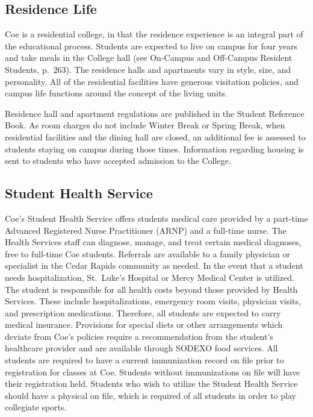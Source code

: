 \documentclass[
  letterpaper,
]{scrbook}
\begin{document}
\hypertarget{residence-life}{%
\subsection{Residence Life}\label{residence-life}}

Coe is a residential college, in that the residence experience is an
integral part of the educational process. Students are expected to live
on campus for four years and take meals in the College hall (see
On-Campus and Off-Campus Resident Students, p.~263). The residence halls
and apartments vary in style, size, and personality. All of the
residential facilities have generous visitation policies, and campus
life functions around the concept of the living units.

Residence hall and apartment regulations are published in the Student
Reference Book. As room charges do not include Winter Break or Spring
Break, when residential facilities and the dining hall are closed, an
additional fee is assessed to students staying on campus during those
times. Information regarding housing is sent to students who have
accepted admission to the College.

\hypertarget{student-health-service}{%
\subsection{Student Health Service}\label{student-health-service}}

Coe's Student Health Service offers students medical care provided by a
part-time Advanced Registered Nurse Practitioner (ARNP) and a full-time
nurse. The Health Services staff can diagnose, manage, and treat certain
medical diagnoses, free to full-time Coe students. Referrals are
available to a family physician or specialist in the Cedar Rapids
community as needed. In the event that a student needs hospitalization,
St.~Luke's Hospital or Mercy Medical Center is utilized. The student is
responsible for all health costs beyond those provided by Health
Services. These include hospitalizations, emergency room visits,
physician visits, and prescription medications. Therefore, all students
are expected to carry medical insurance. Provisions for special diets or
other arrangements which deviate from Coe's policies require a
recommendation from the student's healthcare provider and are available
through SODEXO food services. All students are required to have a
current immunization record on file prior to registration for classes at
Coe. Students without immunizations on file will have their registration
held. Students who wish to utilize the Student Health Service should
have a physical on file, which is required of all students in order to
play collegiate sports.
\end{document}
